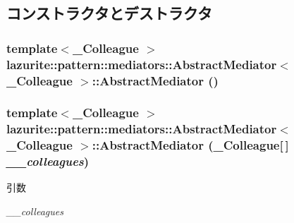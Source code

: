 \subsection{コンストラクタとデストラクタ}
\hypertarget{classlazurite_1_1pattern_1_1mediators_1_1_abstract_mediator_3_01___colleague_01_4_ae8cad80d36be9ed3613089be9bd3f7d0}{
\subsubsection[{AbstractMediator}]{\setlength{\rightskip}{0pt plus 5cm}template$<$\_\-Colleague $>$ lazurite::pattern::mediators::AbstractMediator$<$ \_\-Colleague $>$::AbstractMediator ()}}
\label{classlazurite_1_1pattern_1_1mediators_1_1_abstract_mediator_3_01___colleague_01_4_ae8cad80d36be9ed3613089be9bd3f7d0}
\hypertarget{classlazurite_1_1pattern_1_1mediators_1_1_abstract_mediator_3_01___colleague_01_4_af09ca0cb9331048757088f234f479597}{
\subsubsection[{AbstractMediator}]{\setlength{\rightskip}{0pt plus 5cm}template$<$\_\-Colleague $>$ lazurite::pattern::mediators::AbstractMediator$<$ \_\-Colleague $>$::AbstractMediator (\_\-Colleague\mbox{[}$\,$\mbox{]} {\em \_\-\_\-colleagues})}}
\label{classlazurite_1_1pattern_1_1mediators_1_1_abstract_mediator_3_01___colleague_01_4_af09ca0cb9331048757088f234f479597}

\begin{DoxyParams}{引数}
\item[{\em \_\-\_\-colleagues}]\end{DoxyParams}


